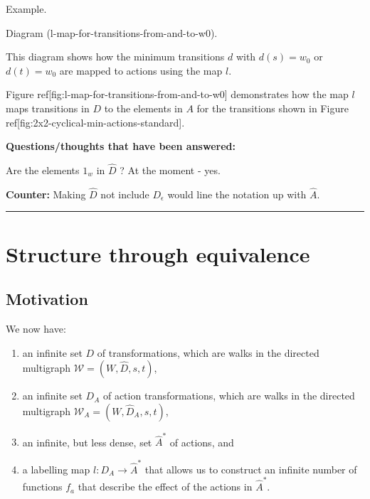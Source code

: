 {\begin{compactitem}
    \item Example.
    \begin{compactitem}
        \item Diagram (l-map-for-transitions-from-and-to-w0).
        \begin{compactitem}
            \item This diagram shows how the minimum transitions $d$ with $d(s) = w_{0}$ or $d(t)= w_{0}$ are mapped to actions using the map $l$.
            \item Figure ref[fig:l-map-for-transitions-from-and-to-w0] demonstrates how the map $l$ maps transitions in $D$ to the elements in $A$ for the transitions shown in Figure ref[fig:2x2-cyclical-min-actions-standard].
        \end{compactitem}
    \end{compactitem}
\end{compactitem}

\textbf{Questions/thoughts that have been answered:}
\begin{compactitem}
    \item Are the elements $1_{w}$ in $\hat{D}$ ? At the moment - yes.
    \begin{compactitem}
        \item \textbf{Counter:} Making $\hat{D}$ not include $D_{\epsilon}$ would line the notation up with $\hat{A}$.
    \end{compactitem}
\end{compactitem}

\noindent\rule{\textwidth}{1mm}
}

\section{Structure through equivalence}
\subsection{Motivation}

We now have:
\begin{enumerate}[(1)]
    \item an infinite set $D$ of transformations, which are walks in the directed multigraph $\mathscr{W}=(W, \hat{D}, s, t)$,
    
    \item an infinite set $D_{A}$ of action transformations, which are walks in the directed multigraph $\mathscr{W}_{A}=(W, \hat{D}_{A}, s, t)$,
    
    \item an infinite, but less dense, set $\hat{A}^{\ast}$ of actions, and

    \item a labelling map $l: D_{A} \to \hat{A}^{\ast}$ that allows us to construct an infinite number of functions $f_{a}$ that describe the effect of the actions in $\hat{A}^{\ast}$.
\end{enumerate}

